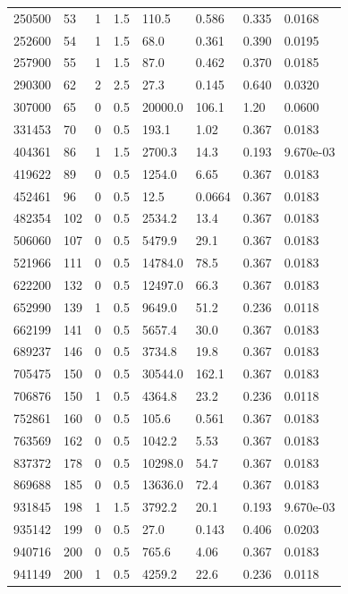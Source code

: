 \documentclass[preview]{standalone}
\begin{document}
{{\begin{tabular}{L{1.2cm}C{1.2cm} C{0.3cm}C{0.5cm} C{1.4cm}C{1.4cm} C{1.4cm}C{1.4cm}}
  250500  &    53  & 1     & 1.5 &  110.5  & 0.586  & 0.335 &  0.0168   \\ 
  252600  &    54  & 1     & 1.5 &  68.0  & 0.361  & 0.390 &  0.0195   \\ 
  257900  &    55  & 1     & 1.5 &  87.0  & 0.462  & 0.370 &  0.0185   \\ 
  290300  &    62  & 2     & 2.5 &  27.3  & 0.145  & 0.640 &  0.0320   \\ 
  307000  &    65  & 0     & 0.5 &  20000.0  & 106.1  & 1.20 &  0.0600   \\ 
  331453  &    70  & 0     & 0.5 &  193.1  & 1.02  & 0.367 &  0.0183   \\ 
  404361  &    86  & 1     & 1.5 &  2700.3  & 14.3  & 0.193 &  9.670e-03   \\ 
  419622  &    89  & 0     & 0.5 &  1254.0  & 6.65  & 0.367 &  0.0183   \\ 
  452461  &    96  & 0     & 0.5 &  12.5  & 0.0664  & 0.367 &  0.0183   \\ 
  482354  &   102  & 0     & 0.5 &  2534.2  & 13.4  & 0.367 &  0.0183   \\ 
  506060  &   107  & 0     & 0.5 &  5479.9  & 29.1  & 0.367 &  0.0183   \\ 
  521966  &   111  & 0     & 0.5 &  14784.0  & 78.5  & 0.367 &  0.0183   \\ 
  622200  &   132  & 0     & 0.5 &  12497.0  & 66.3  & 0.367 &  0.0183   \\ 
  652990  &   139  & 1     & 0.5 &  9649.0  & 51.2  & 0.236 &  0.0118   \\ 
  662199  &   141  & 0     & 0.5 &  5657.4  & 30.0  & 0.367 &  0.0183   \\ 
  689237  &   146  & 0     & 0.5 &  3734.8  & 19.8  & 0.367 &  0.0183   \\ 
  705475  &   150  & 0     & 0.5 &  30544.0  & 162.1  & 0.367 &  0.0183   \\ 
  706876  &   150  & 1     & 0.5 &  4364.8  & 23.2  & 0.236 &  0.0118   \\ 
  752861  &   160  & 0     & 0.5 &  105.6  & 0.561  & 0.367 &  0.0183   \\ 
  763569  &   162  & 0     & 0.5 &  1042.2  & 5.53  & 0.367 &  0.0183   \\ 
  837372  &   178  & 0     & 0.5 &  10298.0  & 54.7  & 0.367 &  0.0183   \\ 
  869688  &   185  & 0     & 0.5 &  13636.0  & 72.4  & 0.367 &  0.0183   \\ 
  931845  &   198  & 1     & 1.5 &  3792.2  & 20.1  & 0.193 &  9.670e-03   \\ 
  935142  &   199  & 0     & 0.5 &  27.0  & 0.143  & 0.406 &  0.0203   \\ 
  940716  &   200  & 0     & 0.5 &  765.6  & 4.06  & 0.367 &  0.0183   \\ 
  941149  &   200  & 1     & 0.5 &  4259.2  & 22.6  & 0.236 &  0.0118   \\ 
\hline 
\end{tabular} 

}}
\end{document}
